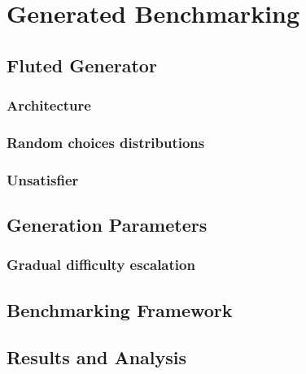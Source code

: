 \chapter{Generated Benchmarking}\label{chap:generated-benchmarking}
  \section{Fluted Generator}\label{sec:fluted-generator}
  \subsection{Architecture}\label{subsec:architecture}
  \subsection{Random choices distributions}\label{subsec:random-choices-distributions}
  \subsection{Unsatisfier}\label{subsec:unsatisfier}
  \section{Generation Parameters}\label{sec:generation-parameters}
  \subsection{Gradual difficulty escalation}\label{subsec:gradual-difficulty-escalation}
  \section{Benchmarking Framework}\label{sec:benchmarking-framework}
  \section{Results and Analysis}\label{sec:results-analysis}
  



